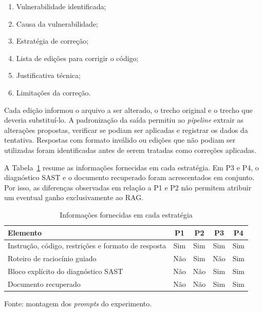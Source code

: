 \begin{enumerate}
    \item Vulnerabilidade identificada;
    \item Causa da vulnerabilidade;
    \item Estratégia de correção;
    \item Lista de edições para corrigir o código;
    \item Justificativa técnica;
    \item Limitações da correção.
\end{enumerate}

Cada edição informou o arquivo a ser alterado, o trecho original e o trecho que deveria substituí-lo. A padronização da saída permitiu ao \textit{pipeline} extrair as alterações propostas, verificar se podiam ser aplicadas e registrar os dados da tentativa. Respostas com formato inválido ou edições que não podiam ser utilizadas foram identificadas antes de serem tratadas como correções aplicadas.

A Tabela~\ref{tab:estrategias} resume as informações fornecidas em cada estratégia. Em P3 e P4, o diagnóstico SAST e o documento recuperado foram acrescentados em conjunto. Por isso, as diferenças observadas em relação a P1 e P2 não permitem atribuir um eventual ganho exclusivamente ao RAG.

\begin{table}[H]
\centering
\caption{Informações fornecidas em cada estratégia}
\label{tab:estrategias}
\renewcommand{\arraystretch}{1.35}
\begin{tabularx}{\textwidth}{|>{\raggedright\arraybackslash}X|c|c|c|c|}
\hline
\textbf{Elemento} & \textbf{P1} & \textbf{P2} & \textbf{P3} & \textbf{P4} \\
\hline
Instrução, código, restrições e formato de resposta & Sim & Sim & Sim & Sim \\
\hline
Roteiro de raciocínio guiado & Não & Sim & Não & Sim \\
\hline
Bloco explícito do diagnóstico SAST & Não & Não & Sim & Sim \\
\hline
Documento recuperado & Não & Não & Sim & Sim \\
\hline
\end{tabularx}

\vspace{0.2cm}
\begin{minipage}{\textwidth}
    \footnotesize
    Fonte: montagem dos \textit{prompts} do experimento.
\end{minipage}
\end{table}


